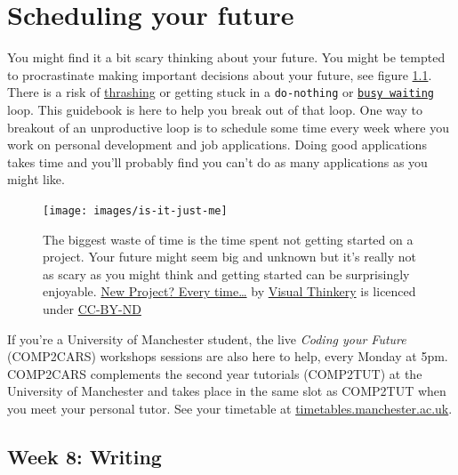 \documentclass[
]{book}
\begin{document}
\hypertarget{scheduling}{%
\chapter{Scheduling your future}\label{scheduling}}

You might find it a bit scary thinking about your future. You might be tempted to procrastinate making important decisions about your future, see figure \ref{fig:schedule-fig}. There is a risk of \href{https://en.wikipedia.org/wiki/Thrashing_(computer_science)}{thrashing} or getting stuck in a \texttt{do-nothing} or \href{https://en.wikipedia.org/wiki/Busy_waiting}{\texttt{busy\ waiting}} loop. This guidebook is here to help you break out of that loop. One way to breakout of an unproductive loop is to schedule some time every week where you work on personal development and job applications. Doing good applications takes time and you'll probably find you can't do as many applications as you might like.

\begin{figure}

{\centering \texttt{[image: images/is-it-just-me]} 

}

\caption{The biggest waste of time is the time spent not getting started on a project. Your future might seem big and unknown but it's really not as scary as you might think and getting started can be surprisingly enjoyable. \href{https://bryanmmathers.com/new-project-every-time/}{New Project? Every time\ldots{}} by \href{https://visualthinkery.com/}{Visual Thinkery} is licenced under \href{https://creativecommons.org/licenses/by-nd/4.0/}{CC-BY-ND}}\label{fig:schedule-fig}
\end{figure}



If you're a University of Manchester student, the live \emph{Coding your Future} (COMP2CARS) workshops sessions are also here to help, every Monday at 5pm. COMP2CARS complements the second year tutorials (COMP2TUT) at the University of Manchester and takes place in the same slot as COMP2TUT when you meet your personal tutor. See your timetable at \href{https://timetables.manchester.ac.uk/}{timetables.manchester.ac.uk}.

\hypertarget{week8}{%
\section{Week 8: Writing}\label{week8}}
\end{document}
